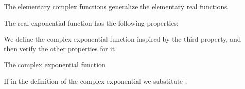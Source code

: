 The elementary complex functions generalize the elementary real functions.

\EMhold


\begin{EMunit}

The real exponential function  has the following properties:


\end{EMunit}

We define the complex exponential function inspired by the third property, and then verify the other properties for it.

\begin{EMdefinition}{The complex exponential function}


\end{EMdefinition}

\begin{EMunit}

If in the definition of the complex exponential we substitute :


\end{EMunit}

\begin{EMimportant}{}


\end{EMimportant}

